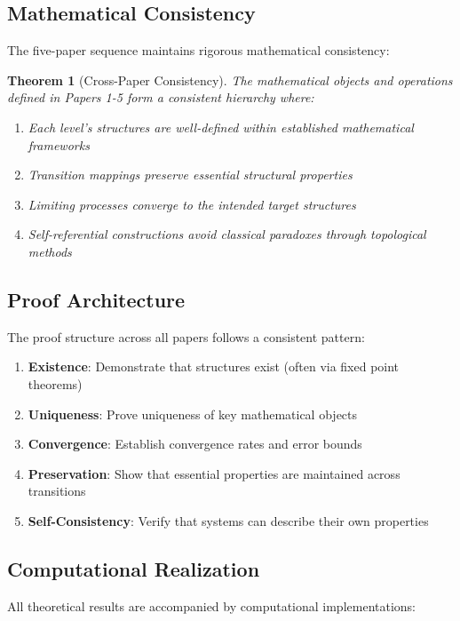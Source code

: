 \documentclass[12pt]{article}
\theoremstyle{plain}
\newtheorem{theorem}{Theorem}[section]
\theoremstyle{definition}
\begin{document}
\subsection{Mathematical Consistency}

The five-paper sequence maintains rigorous mathematical consistency:

\begin{theorem}[Cross-Paper Consistency]
The mathematical objects and operations defined in Papers 1-5 form a consistent hierarchy where:
\begin{enumerate}
\item Each level's structures are well-defined within established mathematical frameworks
\item Transition mappings preserve essential structural properties
\item Limiting processes converge to the intended target structures
\item Self-referential constructions avoid classical paradoxes through topological methods
\end{enumerate}
\end{theorem}

\subsection{Proof Architecture}

The proof structure across all papers follows a consistent pattern:

\begin{enumerate}
\item \textbf{Existence}: Demonstrate that structures exist (often via fixed point theorems)
\item \textbf{Uniqueness}: Prove uniqueness of key mathematical objects
\item \textbf{Convergence}: Establish convergence rates and error bounds
\item \textbf{Preservation}: Show that essential properties are maintained across transitions
\item \textbf{Self-Consistency}: Verify that systems can describe their own properties
\end{enumerate}

\subsection{Computational Realization}

All theoretical results are accompanied by computational implementations:
\end{document}
